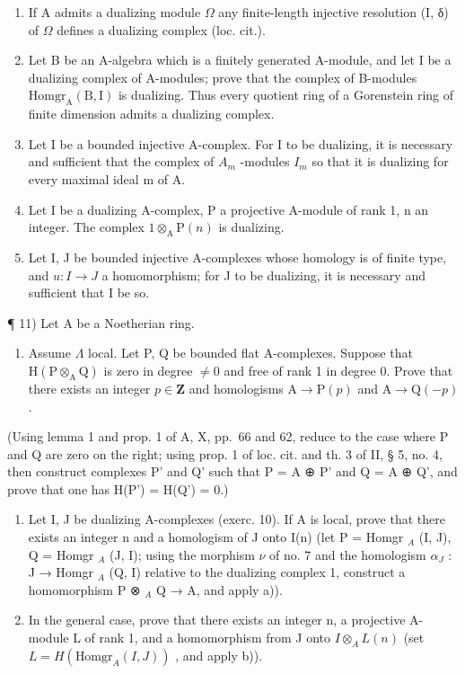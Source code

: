 \begin{enumerate}
\def\labelenumi{\alph{enumi})}
\setcounter{enumi}{1}
\item
  If A admits a dualizing module \(\Omega\) any finite-length injective resolution (I, δ) of \(\Omega\) defines a dualizing complex (loc. cit.).
\item
  Let B be an A-algebra which is a finitely generated A-module, and let I be a dualizing complex of A-modules; prove that the complex of B-modules \(\mathrm{Homgr}_{\mathrm{A}}(\mathrm{B},\mathrm{I})\) is dualizing. Thus every quotient ring of a Gorenstein ring of finite dimension admits a dualizing complex.
\item
  Let I be a bounded injective A-complex. For I to be dualizing, it is necessary and sufficient that the complex of \(A_{m}\) -modules \(I_{m}\) so that it is dualizing for every maximal ideal m of A.
\item
  Let I be a dualizing A-complex, P a projective A-module of rank 1, n an integer. The complex \(1 \otimes_{\mathrm{A}} \mathrm{P}(n)\) is dualizing.
\item
  Let I, J be bounded injective A-complexes whose homology is of finite type, and \(u: I \rightarrow J\) a homomorphism; for J to be dualizing, it is necessary and sufficient that I be so.
\end{enumerate}

¶ 11) Let A be a Noetherian ring.

\begin{enumerate}
\def\labelenumi{\alph{enumi})}
\tightlist
\item
  Assume \(\Lambda\) local. Let P, Q be bounded flat A-complexes. Suppose that \(\mathrm{H}(\mathrm{P}\otimes_{\mathrm{A}}\mathrm{Q})\) is zero in degree \(\neq 0\) and free of rank 1 in degree 0. Prove that there exists an integer \(p\in \mathbf{Z}\) and homologisms \(\mathrm{A}\to \mathrm{P}(p)\) and \(\mathrm{A}\to \mathrm{Q}(-p)\) .
\end{enumerate}

(Using lemma 1 and prop. 1 of A, X, pp.~66 and 62, reduce to the case where P and Q are zero on the right; using prop. 1 of loc. cit. and th. 3 of II, § 5, no. 4, then construct complexes P' and Q' such that P = A ⊕ P' and Q = A ⊕ Q', and prove that one has H(P') = H(Q') = 0.)

\begin{enumerate}
\def\labelenumi{\alph{enumi})}
\setcounter{enumi}{1}
\item
  Let I, J be dualizing A-complexes (exerc. 10). If A is local, prove that there exists an integer n and a homologism of J onto I(n) (let P = Homgr \(_A\) (I, J), Q = Homgr \(_A\) (J, I); using the morphism \(\nu\) of no. 7 and the homologism \(\alpha_{J}\) : J → Homgr \(_A\) (Q, I) relative to the dualizing complex 1, construct a homomorphism P ⊗ \(_A\) Q → A, and apply a)).
\item
  In the general case, prove that there exists an integer n, a projective A-module L of rank 1, and a homomorphism from J onto \(I \otimes_{A} L(n)\) (set \(L = H(\text{Homgr}_{A}(I, J))\) , and apply b)).
\end{enumerate}

